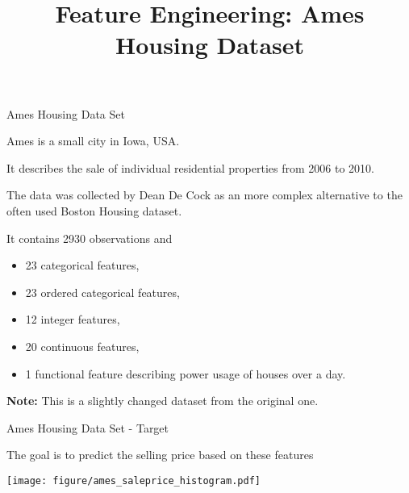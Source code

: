 



\newcommand{\titlefigure}{ames_dataset_title.png}
\newcommand{\learninggoals}{
  \item Understand the Ames Housing dataset structure and complexity
  \item Learn about different feature types in real-world data
  \item Recognize data preprocessing challenges
  \item Appreciate dataset complexity beyond toy examples
}

\title{Feature Engineering: Ames Housing Dataset}
\date{}





\sloppy



\begin{vbframe}{Ames Housing Data Set}

Ames is a small city in Iowa, USA.

It describes the sale of individual residential properties from 2006 to 2010.

The data was collected by Dean De Cock as an more complex alternative to the often used Boston Housing dataset.

It contains 2930 observations and

\begin{itemize}
\item 23 categorical features,
\item 23 ordered categorical features,
\item 12 integer features,
\item 20 continuous features,
\item 1 functional feature describing power usage of houses over a day.
\end{itemize}

\textbf{Note:} This is a slightly changed dataset from the original one.

\end{vbframe}


\begin{vbframe}{Ames Housing Data Set - Target}

The goal is to predict the selling price based on these features

\vfill

\begin{center}
\texttt{[image: figure/ames\_saleprice\_histogram.pdf]}
\end{center}

\vfill

\end{vbframe}

\endlecture

